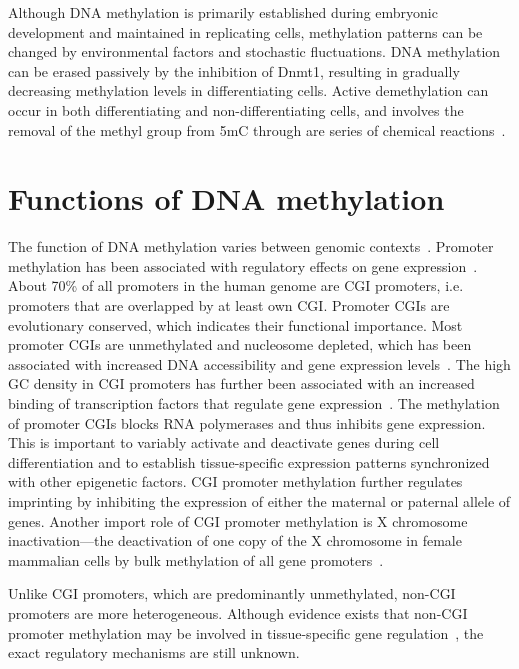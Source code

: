 Although DNA methylation is primarily established during embryonic development and maintained in replicating cells, methylation patterns can be changed by environmental factors and stochastic fluctuations. DNA methylation can be erased passively by the inhibition of Dnmt1, resulting in gradually decreasing methylation levels in differentiating cells. Active demethylation can occur in both differentiating and non-differentiating cells, and involves the removal of the methyl group from 5mC through are series of chemical reactions~\citep{mayer_embryogenesis:_2000,zhang_active_2007}.

\section{Functions of DNA methylation} \label{sec:intro_fun}

The function of DNA methylation varies between genomic contexts~\citep{bestor_notes_2015,moore_dna_2013,jones_functions_2012,bird_dna_2002}. Promoter methylation has been associated with regulatory effects on gene expression~\citep{moore_dna_2013,jones_functions_2012,bird_dna_2002}. About 70\% of all promoters in the human genome are CGI promoters, i.e. promoters that are overlapped by at least own CGI. Promoter CGIs are evolutionary conserved, which indicates their functional importance. Most promoter CGIs are unmethylated and nucleosome depleted, which has been associated with increased DNA accessibility and gene expression levels~\citep{moore_dna_2013}. The high GC density in CGI promoters has further been associated with an increased binding of transcription factors that regulate gene expression~\citep{moore_dna_2013}. The methylation of promoter CGIs blocks RNA polymerases and thus inhibits gene expression. This is important to variably activate and deactivate genes during cell differentiation and to establish tissue-specific expression patterns synchronized with other epigenetic factors. CGI promoter methylation further regulates imprinting by inhibiting the expression of either the maternal or paternal allele of genes. Another import role of CGI promoter methylation is X chromosome inactivation—the deactivation of one copy of the X chromosome in female mammalian cells by bulk methylation of all gene promoters~\citep{bestor_notes_2015}.

Unlike CGI promoters, which are predominantly unmethylated, non-CGI promoters are more heterogeneous. Although evidence exists that non-CGI promoter methylation may be involved in tissue-specific gene regulation~\citep{moore_dna_2013,jones_functions_2012}, the exact regulatory mechanisms are still unknown.

